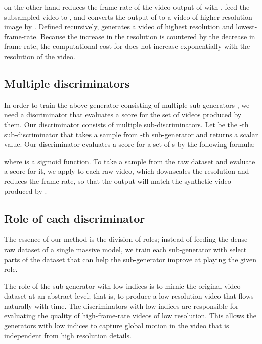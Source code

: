 \documentclass[twocolumn]{svjour3}
\begin{document}
 on the other hand reduces the frame-rate of the video output of  with , feed the subsampled video to , and converts the output of  to a video of higher resolution image  by .
Defined recursively,  generates a video of highest resolution and lowest-frame-rate.
Because the increase in the resolution is countered by the decrease in frame-rate, the computational cost for  does not increase exponentially with the resolution of the video.











\subsection{Multiple discriminators}



In order to train the above generator consisting of multiple sub-generators , we need a discriminator that evaluates a score for the set of videos produced by them.
Our discriminator consists of multiple sub-discriminators.
Let  be the -th sub-discriminator that takes a sample   from -th sub-generator  and returns a scalar value.
Our discriminator  evaluates a score for a set of s by the following formula:
\vspace{-1truemm}

where  is a sigmoid function.
To take a sample from the raw dataset and evaluate a score for it, we apply  to each raw video, which downscales the resolution and reduces the frame-rate, so that the output will match the synthetic video produced by .




\subsection{Role of each discriminator}

The essence of our method is the division of roles;
instead of feeding the dense raw dataset of a single massive model,
we train each sub-generator with select parts of the dataset that can help the sub-generator improve at playing the given role.


The role of the sub-generator with low indices is to mimic the original video dataset at an abstract level; that is, to produce a low-resolution video that flows naturally with time.
The discriminators with low indices are responsible for evaluating the quality of high-frame-rate videos of low resolution.
This allows the generators with low indices to capture global motion in the video that is independent from high resolution details.
\end{document}

